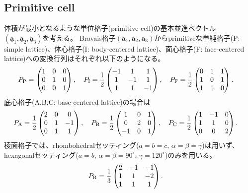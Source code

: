 \documentclass[11pt]{easymemo}
\begin{document}
\subsection{Primitive cell}

体積が最小となるような単位格子(primitive cell)の基本並進ベクトル$(\underline{\bm{a}}_{1},\underline{\bm{a}}_{2},\underline{\bm{a}}_{3})$を考える。
Bravais格子$(\bm{a}_{1},\bm{a}_{2},\bm{a}_{3})$からprimitiveな単純格子(P: simple lattice)、体心格子(I: body-centered lattice)、面心格子(F: face-centered lattice)への変換行列はそれぞれ以下のようになる。
\begin{align}
   &
  P_{\rm P}=\begin{pmatrix}
    1 & 0 & 0 \\
    0 & 1 & 0 \\
    0 & 0 & 1
  \end{pmatrix},
  \quad
  P_{\rm I}=\frac{1}{2}\begin{pmatrix}
    -1 & 1  & 1  \\
    1  & -1 & 1  \\
    1  & 1  & -1
  \end{pmatrix},
  \quad
  P_{\rm F}=\frac{1}{2}\begin{pmatrix}
    0 & 1 & 1 \\
    1 & 0 & 1 \\
    1 & 1 & 0
  \end{pmatrix}.
\end{align}
底心格子(A,B,C: base-centered lattice)の場合は
\begin{align}
   &
  P_{\rm A}=\frac{1}{2}\begin{pmatrix}
    2 & 0 & 0  \\
    0 & 1 & -1 \\
    0 & 1 & 1  \\
  \end{pmatrix},
  \quad
  P_{\rm B}=\frac{1}{2}\begin{pmatrix}
    1  & 0 & 1 \\
    0  & 2 & 0 \\
    -1 & 0 & 1 \\
  \end{pmatrix},
  \quad
  P_{\rm C}=\frac{1}{2}\begin{pmatrix}
    1 & -1 & 0 \\
    1 & 1  & 0 \\
    0 & 0  & 2
  \end{pmatrix}.
\end{align}
稜面格子では、rhombohedralセッティング($a=b=c$, $\alpha=\beta=\gamma$)は用いず、hexagonalセッティング($a=b$, $\alpha=\beta=90^{\circ}$, $\gamma=120^{\circ}$)のみを用いる。
\begin{align}
   &
  P_{\rm R}=\frac{1}{3}\begin{pmatrix}
    2 & -1 & -1 \\
    1 & 1  & -2 \\
    1 & 1  & 1
  \end{pmatrix}.
\end{align}
\end{document}
